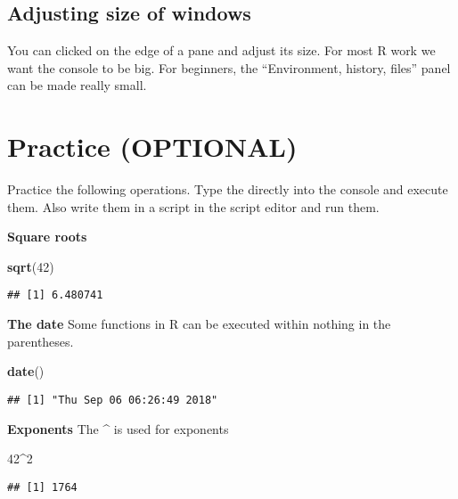 \documentclass[]{book}
\newenvironment{Shaded}{\begin{snugshade}}{\end{snugshade}}
\newcommand{\KeywordTok}[1]{\textcolor[rgb]{0.13,0.29,0.53}{\textbf{#1}}}
\newcommand{\DecValTok}[1]{\textcolor[rgb]{0.00,0.00,0.81}{#1}}
\newcommand{\OperatorTok}[1]{\textcolor[rgb]{0.81,0.36,0.00}{\textbf{#1}}}
\newcommand{\NormalTok}[1]{#1}
\theoremstyle{definition}
\theoremstyle{definition}
\theoremstyle{definition}
\theoremstyle{remark}
\begin{document}
\subsection{Adjusting size of windows}\label{adjusting-size-of-windows}

You can clicked on the edge of a pane and adjust its size. For most R
work we want the console to be big. For beginners, the ``Environment,
history, files'' panel can be made really small.

\section{Practice (OPTIONAL)}\label{practice-optional}

Practice the following operations. Type the directly into the console
and execute them. Also write them in a script in the script editor and
run them.

\textbf{Square roots}

\begin{Shaded}
\begin{Highlighting}[]
\KeywordTok{sqrt}\NormalTok{(}\DecValTok{42}\NormalTok{)}
\end{Highlighting}
\end{Shaded}

\begin{verbatim}
## [1] 6.480741
\end{verbatim}

\textbf{The date} Some functions in R can be executed within nothing in
the parentheses.

\begin{Shaded}
\begin{Highlighting}[]
\KeywordTok{date}\NormalTok{()}
\end{Highlighting}
\end{Shaded}

\begin{verbatim}
## [1] "Thu Sep 06 06:26:49 2018"
\end{verbatim}

\textbf{Exponents} The \textbf{\^{}} is used for exponents

\begin{Shaded}
\begin{Highlighting}[]
\DecValTok{42}\OperatorTok{^}\DecValTok{2}
\end{Highlighting}
\end{Shaded}

\begin{verbatim}
## [1] 1764
\end{verbatim}
\end{document}
